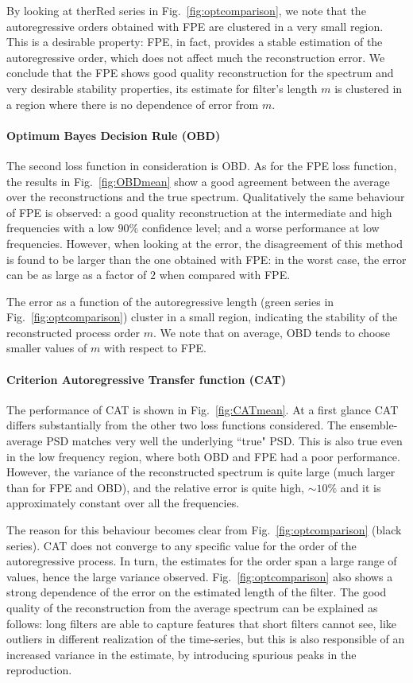 \documentclass[twocolumn,showpacs,preprintnumbers,nofootinbib,prd,
superscriptaddress,10pt]{revtex4-1}
\begin{document}
By looking at therRed series in Fig.~\ref{fig:optcomparison}, we note that the autoregressive orders obtained with FPE are clustered in a very small region. This is a desirable property: FPE, in fact, provides a stable estimation of the autoregressive order, which does not affect much the reconstruction error.
We conclude that the FPE shows good quality reconstruction for the spectrum and very desirable stability properties, its estimate for filter's length $m$ is clustered in a region where there is no dependence of error from $m$. 
\paragraph{Optimum Bayes Decision Rule (OBD)}
The second loss function in consideration is OBD. As for the FPE loss function, the results in Fig.~\ref{fig:OBDmean} show a 
good agreement between the average over the reconstructions and the true spectrum.
Qualitatively the same behaviour of FPE is observed: a good quality reconstruction at the intermediate and high frequencies with a low $90\%$ confidence level; and a worse performance at low frequencies.
However, when looking at the error, the disagreement of this method is found to be larger than the one obtained with FPE: in the worst case, the error can be as large as a factor of $2$ when compared with FPE. 

The error as a function of the autoregressive length (green series in Fig.~\ref{fig:optcomparison}) cluster in a small region, indicating the stability of the reconstructed process order $m$. We note that on average, OBD tends to choose smaller values of $m$ with respect to FPE.

\paragraph{Criterion Autoregressive Transfer function (CAT)}
The performance of CAT is shown in Fig.~\ref{fig:CATmean}. At a first glance CAT differs substantially from the other two loss functions considered.
The ensemble-average PSD matches very well the underlying ``true" PSD. This is also true even in the low frequency region, 
where both OBD and FPE had a poor performance.
However, the variance of the reconstructed spectrum is quite large (much larger than for FPE and OBD), and the relative error is quite high, $\sim 10\%$ and it is approximately constant over all the frequencies.

The reason for this behaviour becomes clear from Fig.~\ref{fig:optcomparison} (black series). CAT does not converge 
to any specific value for the order of the autoregressive process.
In turn, the estimates for the order span a large range of values, hence the large variance observed.
Fig.~\ref{fig:optcomparison} also shows a strong dependence of the error on the estimated length of the filter. The good quality of the reconstruction from the average spectrum can be explained as follows: long filters are able to capture features that short filters cannot see, like outliers in different realization of the time-series, but this is also responsible of an increased variance in the estimate, by introducing spurious peaks in the reproduction.
\end{document}
